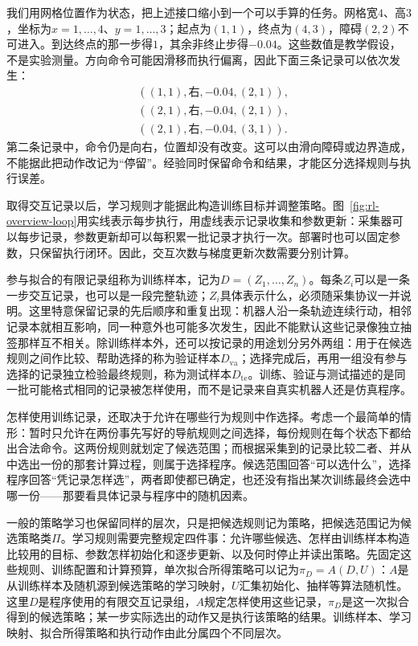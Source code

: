 我们用网格位置作为状态，把上述接口缩小到一个可以手算的任务。网格宽$4$、高$3$，坐标为$x=1,\ldots,4$、$y=1,\ldots,3$；起点为$(1,1)$，终点为$(4,3)$，障碍$(2,2)$不可进入。到达终点的那一步得$1$，其余非终止步得$-0.04$。这些数值是教学假设，不是实验测量。方向命令可能因滑移而执行偏离，因此下面三条记录可以依次发生：
\[
\begin{aligned}
 &((1,1),\text{右},-0.04,(2,1)),\\
 &((2,1),\text{右},-0.04,(2,1)),\\
 &((2,1),\text{右},-0.04,(3,1)).
\end{aligned}
\]
第二条记录中，命令仍是向右，位置却没有改变。这可以由滑向障碍或边界造成，不能据此把动作改记为“停留”。经验同时保留命令和结果，才能区分选择规则与执行误差。

取得交互记录以后，学习规则才能据此构造训练目标并调整策略。图~\ref{fig:rl-overview-loop}用实线表示每步执行，用虚线表示记录收集和参数更新：采集器可以每步记录，参数更新却可以每积累一批记录才执行一次。部署时也可以固定参数，只保留执行闭环。因此，交互次数与梯度更新次数需要分别计算。

参与拟合的有限记录组称为训练样本，记为$D=(Z_1,\ldots,Z_n)$。每条$Z_i$可以是一条一步交互记录，也可以是一段完整轨迹；$Z_i$具体表示什么，必须随采集协议一并说明。这里特意保留记录的先后顺序和重复出现：机器人沿一条轨迹连续行动，相邻记录本就相互影响，同一种意外也可能多次发生，因此不能默认这些记录像独立抽签那样互不相关。除训练样本外，还可以按记录的用途划分另外两组：用于在候选规则之间作比较、帮助选择的称为验证样本$D_{\mathrm{va}}$；选择完成后，再用一组没有参与选择的记录独立检验最终规则，称为测试样本$D_{\mathrm{te}}$。训练、验证与测试描述的是同一批可能格式相同的记录被怎样使用，而不是记录来自真实机器人还是仿真程序。

怎样使用训练记录，还取决于允许在哪些行为规则中作选择。考虑一个最简单的情形：暂时只允许在两份事先写好的导航规则之间选择，每份规则在每个状态下都给出合法命令。这两份规则就划定了候选范围；而根据采集到的记录比较二者、并从中选出一份的那套计算过程，则属于选择程序。候选范围回答“可以选什么”，选择程序回答“凭记录怎样选”，两者即使都已确定，也还没有指出某次训练最终会选中哪一份——那要看具体记录与程序中的随机因素。

一般的策略学习也保留同样的层次，只是把候选规则记为策略，把候选范围记为候选策略类$\Pi$。学习规则需要完整规定四件事：允许哪些候选、怎样由训练样本构造比较用的目标、参数怎样初始化和逐步更新、以及何时停止并读出策略。先固定这些规则、训练配置和计算预算，单次拟合所得策略可以记为$\pi_D=A(D,U)$：$A$是从训练样本及随机源到候选策略的学习映射，$U$汇集初始化、抽样等算法随机性。这里$D$是程序使用的有限交互记录组，$A$规定怎样使用这些记录，$\pi_D$是这一次拟合得到的候选策略；某一步实际选出的动作又是执行该策略的结果。训练样本、学习映射、拟合所得策略和执行动作由此分属四个不同层次。

